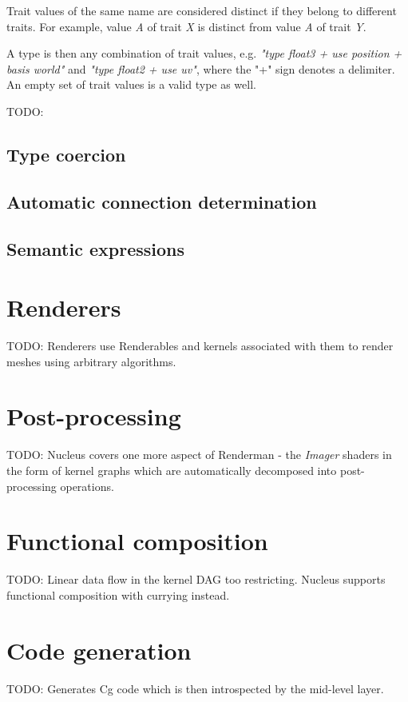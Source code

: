 Trait values of the same name are considered distinct if they belong to different traits. For example, value \emph{A} of trait \emph{X} is distinct from value \emph{A} of trait \emph{Y}.

A type is then any combination of trait values, e.g. \emph{"type float3 + use position + basis world"} and \emph{"type float2 + use uv"}, where the "+" sign denotes a delimiter. An empty set of trait values is a valid type as well.

TODO:
	
\subsection{Type coercion}

\subsection{Automatic connection determination}

\subsection{Semantic expressions}

\section{Renderers}

TODO: Renderers use Renderables and kernels associated with them to render meshes using arbitrary algorithms.

\section{Post-processing}

TODO: Nucleus covers one more aspect of Renderman - the \emph{Imager} shaders in the form of kernel graphs which are automatically decomposed into post-processing operations.

\section{Functional composition}

TODO: Linear data flow in the kernel DAG too restricting. Nucleus supports functional composition with currying instead.

\section{Code generation}

TODO: Generates Cg code which is then introspected by the mid-level layer.
